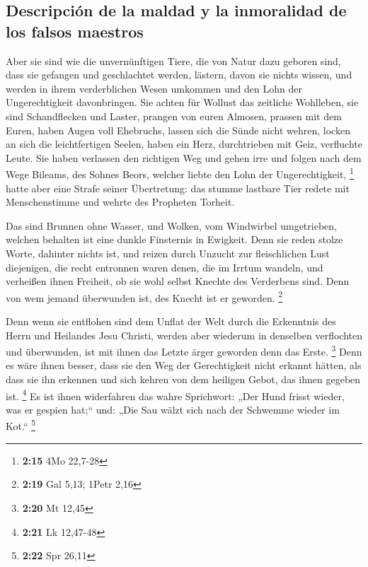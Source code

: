 \hypertarget{descripciuxf3n-de-la-maldad-y-la-inmoralidad-de-los-falsos-maestros}{%
\subsection{Descripción de la maldad y la inmoralidad de los falsos
maestros}\label{descripciuxf3n-de-la-maldad-y-la-inmoralidad-de-los-falsos-maestros}}

 Aber sie sind wie die unvernünftigen Tiere, die von
Natur dazu geboren sind, dass sie gefangen und geschlachtet werden,
lästern, davon sie nichts wissen, und werden in ihrem verderblichen
Wesen umkommen  und den Lohn der Ungerechtigkeit
davonbringen. Sie achten für Wollust das zeitliche Wohlleben, sie sind
Schandflecken und Laster, prangen von euren Almosen, prassen mit dem
Euren,  haben Augen voll Ehebruchs, lassen sich die Sünde
nicht wehren, locken an sich die leichtfertigen Seelen, haben ein Herz,
durchtrieben mit Geiz, verfluchte Leute.  Sie haben
verlassen den richtigen Weg und gehen irre und folgen nach dem Wege
Bileams, des Sohnes Beors, welcher liebte den Lohn der Ungerechtigkeit,
\footnote{\textbf{2:15} 4Mo 22,7-28}  hatte aber eine
Strafe seiner Übertretung: das stumme lastbare Tier redete mit
Menschenstimme und wehrte des Propheten Torheit.

 Das sind Brunnen ohne Wasser, und Wolken, vom Windwirbel
umgetrieben, welchen behalten ist eine dunkle Finsternis in Ewigkeit.
 Denn sie reden stolze Worte, dahinter nichts ist, und
reizen durch Unzucht zur fleischlichen Lust diejenigen, die recht
entronnen waren denen, die im Irrtum wandeln,  und
verheißen ihnen Freiheit, ob sie wohl selbst Knechte des Verderbens
sind. Denn von wem jemand überwunden ist, des Knecht ist er geworden.
\footnote{\textbf{2:19} Gal 5,13; 1Petr 2,16}

 Denn wenn sie entflohen sind dem Unflat der Welt durch
die Erkenntnis des Herrn und Heilandes Jesu Christi, werden aber
wiederum in denselben verflochten und überwunden, ist mit ihnen das
Letzte ärger geworden denn das Erste. \footnote{\textbf{2:20} Mt 12,45}
 Denn es wäre ihnen besser, dass sie den Weg der
Gerechtigkeit nicht erkannt hätten, als dass sie ihn erkennen und sich
kehren von dem heiligen Gebot, das ihnen gegeben ist. \footnote{\textbf{2:21}
  Lk 12,47-48}  Es ist ihnen widerfahren das wahre
Sprichwort: „Der Hund frisst wieder, was er gespien hat;`` und: „Die Sau
wälzt sich nach der Schwemme wieder im Kot.`` \footnote{\textbf{2:22}
  Spr 26,11}

